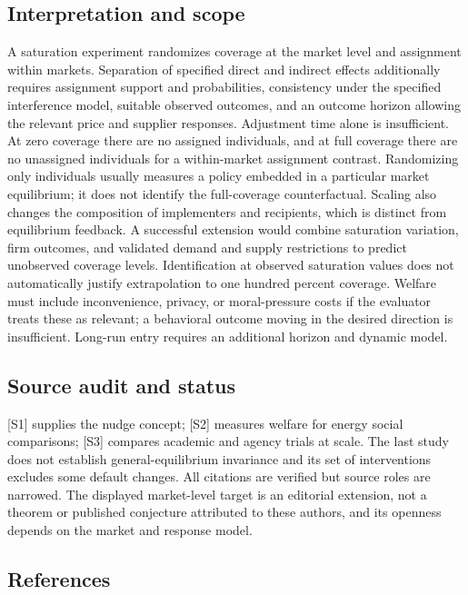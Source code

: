 \documentclass[11pt,a4paper]{article}
\begin{document}
\subsection*{Interpretation and scope}

A saturation experiment randomizes coverage at the market level and assignment within markets. Separation of specified direct and indirect effects additionally requires assignment support and probabilities, consistency under the specified interference model, suitable observed outcomes, and an outcome horizon allowing the relevant price and supplier responses. Adjustment time alone is insufficient. At zero coverage there are no assigned individuals, and at full coverage there are no unassigned individuals for a within-market assignment contrast. Randomizing only individuals usually measures a policy embedded in a particular market equilibrium; it does not identify the full-coverage counterfactual. Scaling also changes the composition of implementers and recipients, which is distinct from equilibrium feedback. A successful extension would combine saturation variation, firm outcomes, and validated demand and supply restrictions to predict unobserved coverage levels. Identification at observed saturation values does not automatically justify extrapolation to one hundred percent coverage. Welfare must include inconvenience, privacy, or moral-pressure costs if the evaluator treats these as relevant; a behavioral outcome moving in the desired direction is insufficient. Long-run entry requires an additional horizon and dynamic model.

\subsection*{Source audit and status}

[S1] supplies the nudge concept; [S2] measures welfare for energy social comparisons; [S3] compares academic and agency trials at scale. The last study does not establish general-equilibrium invariance and its set of interventions excludes some default changes. All citations are verified but source roles are narrowed. The displayed market-level target is an editorial extension, not a theorem or published conjecture attributed to these authors, and its openness depends on the market and response model.

\subsection*{References}
\end{document}
